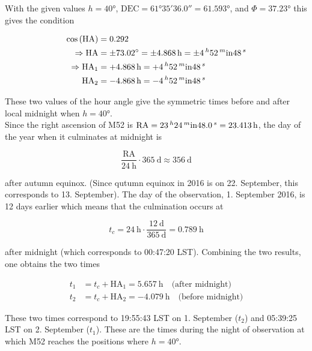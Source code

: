 \documentclass[11pt,a4paper,twoside]{article}
\begin{document}
With the given values $h = \ang{40}$, $\text{DEC} = \ang{61;35;36.0} = \ang{61.593}$, and $\Phi = \ang{37.23}$ this gives the condition

\begin{align}
 \cos{\left( \text{HA} \right)} &= 0.292 \\
 \Rightarrow \text{HA} &= \pm \ang{73.02} = \pm \SI{4.868}{\hour} = \pm \SI{4}{^\hour} \SI{52}{^\minute} \SI{48}{^\second} \\
 \Rightarrow \text{HA}_1 &= +\SI{4.868}{\hour} = +\SI{4}{^\hour} \SI{52}{^\minute} \SI{48}{^\second} \\
 \text{HA}_2 &= -\SI{4.868}{\hour} = -\SI{4}{^\hour} \SI{52}{^\minute} \SI{48}{^\second} \\
\end{align}

These two values of the hour angle give the symmetric times before and after local midnight when $h=\ang{40}$. \\

Since the right ascension of M52 is $\text{RA} = \SI{23}{^\hour} \SI{24}{^\minute} \SI{48.0}{^\second} = \SI{23.413}{\hour}$, the day of the year when it culminates at midnight is 

\begin{equation}
 \frac{\text{RA}}{\SI{24}{\hour}} \cdot \SI{365}{\day} \approx \SI{356}{\day}
\end{equation}

after autumn equinox. (Since qutumn equinox in 2016 is on 22. September, this corresponds to 13. September). The day of the observation, 1. September 2016, is 12 days earlier which means that the culmination occurs at 

\begin{equation}
 t_c = \SI{24}{\hour} \cdot \frac{\SI{12}{\day}}{\SI{365}{\day}} = \SI{0.789}{\hour}
\end{equation}

after midnight (which corresponds to 00:47:20 LST). Combining the two results, one obtains the two times 

\begin{align}
 t_1 &= t_c + \text{HA}_1 = \SI{5.657}{\hour} \quad \text{(after midnight)} \\
 t_2 &= t_c + \text{HA}_2 = \SI{-4.079}{\hour} \quad \text{(before midnight)}
\end{align}

These two times correspond to 19:55:43 LST on 1. September ($t_2$) and 05:39:25 LST on 2. September ($t_1$). These are the times during the night of observation at which M52 reaches the positions where $h=\ang{40}$. 
\end{document}
